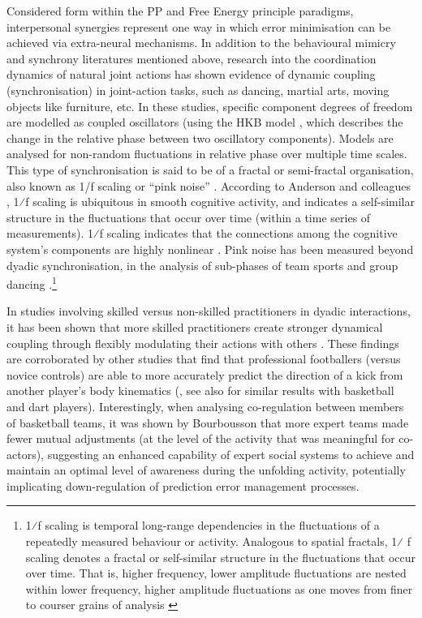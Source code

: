 Considered form within the PP and Free Energy principle paradigms, interpersonal synergies represent one way in which error minimisation can be achieved via extra-neural mechanisms.  In addition to the behavioural mimicry and synchrony literatures mentioned above, research into the coordination dynamics of natural joint actions  has shown evidence of dynamic coupling (synchronisation) in joint-action tasks, such as dancing, martial arts, moving objects like furniture, etc. In these studies, specific component degrees of freedom are modelled as coupled oscillators (using the HKB model \citep{Haken1985,Kelso1986}, which describes the change in the relative phase between two oscillatory components). Models are analysed for non-random fluctuations in relative phase over multiple time scales.  This type of synchronisation is said to be of a fractal or semi-fractal organisation, also known as 1/f scaling or ``pink noise'' \citep{Caron2017}. According to Anderson and colleagues \citep{Anderson2012}, 1⁄f scaling is ubiquitous in smooth cognitive activity, and indicates a self-similar structure in the fluctuations that occur over time (within a time series of measurements).
1⁄f scaling indicates that the connections among the cognitive system's components are highly nonlinear \citep{Ding2002,Holden2013,Kello2010,Riley2011,VanOrden2003,VanOrden2005}. Pink noise has been measured beyond dyadic synchronisation, in the analysis of sub-phases of team sports \citep{Passos2014,Duarte2012} and group dancing \citep{Chauvigne2017}.\footnote{1⁄f scaling is temporal long-range dependencies in the fluctuations of a repeatedly measured behaviour or activity. Analogous to spatial fractals, 1⁄ f scaling denotes a fractal or self-similar structure in the fluctuations that occur over time. That is, higher frequency, lower amplitude fluctuations are nested within lower frequency, higher amplitude fluctuations as one moves from finer to courser grains of analysis \cites(for a more detailed description see, for example)(){Holden2005}{Kello2009}}

In studies involving skilled versus non-skilled practitioners in dyadic interactions, it has been shown that more skilled practitioners create stronger dynamical coupling through flexibly modulating their actions with others \citep{Schmidt2011, Caron2017}. These findings are corroborated by other studies that find that professional footballers (versus novice controls) are able to more accurately predict the direction of a kick from another player's body kinematics (\cite{Tomeo2012}, see also \cite{Aglioti2008,Mulligan2016} for similar results with basketball and dart players). Interestingly, when analysing co-regulation between members of basketball teams, it was shown by Bourbousson \textcite{Bourbousson2015} that more expert teams made fewer mutual adjustments (at the level of the activity that was meaningful for co-actors), suggesting an enhanced capability of expert social systems to achieve and maintain an optimal level of awareness during the unfolding activity, potentially implicating down-regulation of prediction error management processes.

